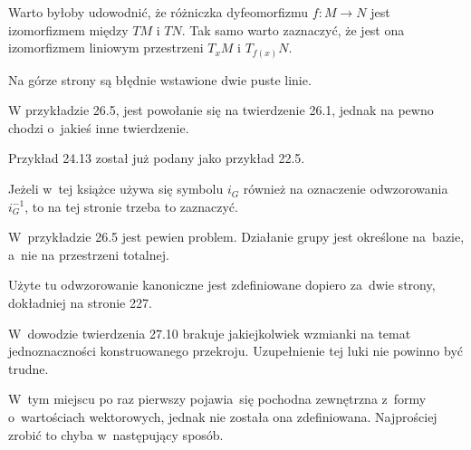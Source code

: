 \documentclass[a4paper,11pt]{article}
\begin{document}
\start Warto byłoby udowodnić, że różniczka dyfeomorfizmu
$f : M \rightarrow N$ jest izomorfizmem między $TM$ i $TN$. Tak samo
warto zaznaczyć, że jest ona izomorfizmem liniowym przestrzeni
$T_{ x }M$ i $T_{ f( x ) }N$.

\start {} Na górze strony są błędnie wstawione dwie puste
linie.

\start {} W przykładzie 26.5, jest powołanie się na twierdzenie
26.1, jednak na pewno chodzi o~jakieś inne twierdzenie.

\start {} Przykład 24.13 został już podany jako przykład 22.5.

\start {} Jeżeli w~tej książce używa się symbolu $i_{ G }$
również na oznaczenie odwzorowania $i_{ G }^{ -1 }$, to na tej stronie
trzeba to zaznaczyć.

\start {} W~przykładzie 26.5 jest pewien problem. Działanie
grupy jest określone na~bazie, a~nie na przestrzeni totalnej.

\start {} Użyte tu odwzorowanie kanoniczne jest zdefiniowane
dopiero za~dwie strony, dokładniej na stronie 227.

\start {} W~dowodzie twierdzenia 27.10 brakuje jakiejkolwiek
wzmianki na temat jednoznaczności konstruowanego przekroju.
Uzupełnienie tej luki nie powinno być trudne.

\start {} W~tym miejscu po raz pierwszy pojawia~się pochodna
zewnętrzna z~formy o~wartościach wektorowych, jednak nie została ona
zdefiniowana. Najprościej zrobić to chyba w~następujący sposób.
\end{document}
